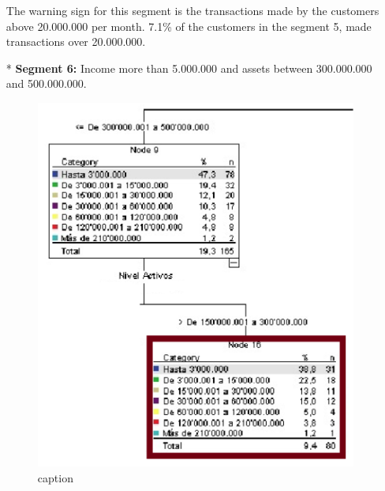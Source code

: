 \begin{itemize}
\begin{figure}[ht!]
\end{figure}
The warning sign for this segment is the transactions made by the customers above 20.000.000 per month.  7.1\% of the customers in the segment 5, made transactions over 20.000.000.
\item[*] \textbf{Segment 6:}
Income more than 5.000.000 and assets between 300.000.000 and 500.000.000.
\begin{figure}[ht!]
  \centering
  \includegraphics[scale=0.3]{Segmento6}
  \caption{caption}


\end{figure}
\end{itemize}
